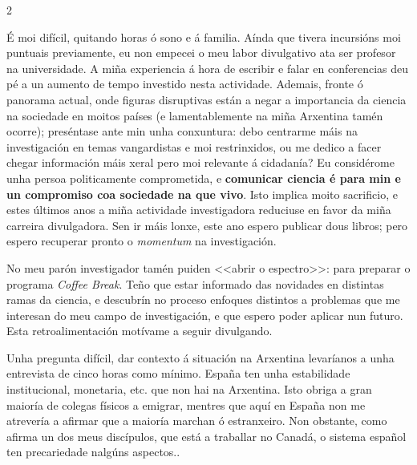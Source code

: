 \begin{multicols}{2}



É moi difícil, quitando horas ó sono e á familia. Aínda que tivera incursións
moi puntuais previamente, eu non empecei o meu labor divulgativo ata ser
profesor na universidade. A miña experiencia á hora de escribir e falar en
conferencias deu pé a un aumento de tempo investido nesta actividade. Ademais,
fronte ó panorama actual, onde figuras disruptivas están a negar a importancia
da ciencia na sociedade en moitos países (e lamentablemente na miña Arxentina
tamén ocorre); preséntase ante min unha conxuntura: debo centrarme máis na
investigación en temas vangardistas e moi restrinxidos, ou me dedico a facer
chegar información máis xeral pero moi relevante á cidadanía? Eu considérome
unha persoa politicamente comprometida, e \textbf{comunicar ciencia é para min
e un compromiso coa sociedade na que vivo}. Isto implica moito sacrificio, e
estes últimos anos a miña actividade investigadora reduciuse en favor da miña
carreira divulgadora. Sen ir máis lonxe, este ano espero publicar dous libros;
pero espero recuperar pronto o \emph{momentum} na investigación.

No meu parón investigador tamén puiden <<abrir o espectro>>: para preparar o
programa \emph{Coffee Break}. Teño que estar informado das novidades en
distintas ramas da ciencia, e descubrín no proceso enfoques distintos a
problemas que me interesan do meu campo de investigación, e que espero poder
aplicar nun futuro. Esta retroalimentación motívame a seguir divulgando.





Unha pregunta difícil, dar contexto á situación na Arxentina levaríanos a unha
entrevista de cinco horas como mínimo. España ten unha estabilidade
institucional, monetaria, etc. que non hai na Arxentina. Isto obriga a gran
maioría de colegas físicos a emigrar, mentres que aquí en España non me
atrevería a afirmar que a maioría marchan ó estranxeiro. Non obstante, como
afirma un dos meus discípulos, que está a traballar no Canadá, o sistema
español ten precariedade nalgúns aspectos..


\end{multicols}
